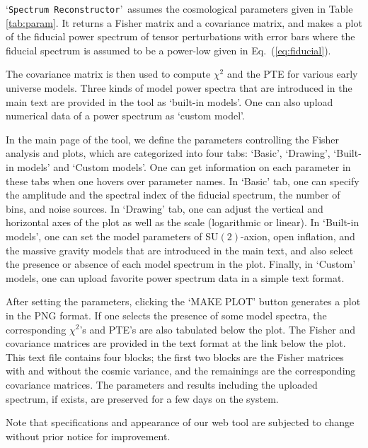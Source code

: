 \documentclass[tightenlines,floats,aps,nofootinbib,prd,onecolumn,preprintnumbers]{revtex4}
\newcommand{\appname}{`{\tt Spectrum Reconstructor}'~}
\begin{document}
\appname assumes the cosmological parameters given in
Table \ref{tab:param}. It returns a Fisher matrix and
a covariance matrix, and makes a plot of 
the fiducial power spectrum of tensor perturbations with error bars
where the fiducial spectrum is assumed to be a power-low given in
Eq.~(\ref{eq:fiducial}).

The covariance matrix is then used to compute $\chi^2$ and the PTE for
various early universe models. Three kinds of model power spectra
that are introduced in the main text are provided in the tool as
`built-in models'. One can also upload numerical data of a power
spectrum as `custom model'.

In the main page of the tool, we define the parameters controlling the
Fisher analysis and plots, which are categorized into four tabs: `Basic',
`Drawing', `Built-in models' and `Custom models'. One can get
information on each parameter in these tabs when one hovers over
parameter names.
In `Basic' tab, one can specify the amplitude and the spectral index of
the fiducial spectrum, the number of bins, and noise sources. In
`Drawing' tab, one can adjust the vertical and horizontal axes of the
plot as well as the scale (logarithmic or linear). 
In `Built-in models', one can set the
model parameters of SU$(2)$-axion, open inflation, and the massive
gravity models that are introduced in the main text, and also select 
the presence or absence of each model spectrum in the plot.
Finally, in `Custom' models, one can upload favorite power spectrum data
in a simple text format.

After setting the parameters, clicking the `MAKE PLOT' button generates
a plot in the PNG format. If one selects the presence of
some model spectra, the corresponding $\chi^2$'s and PTE's are also
tabulated below the plot. The Fisher and covariance matrices are
provided in the text format at the link below the plot.
This text file contains four blocks; the first two blocks are the Fisher
matrices with and without the cosmic variance, and the remainings are
the corresponding covariance matrices. The parameters and results
including the uploaded spectrum, if exists, are preserved for a few days
on the system. 

Note that specifications and appearance of our web tool are subjected to
change without prior notice for improvement. 
\end{document}
